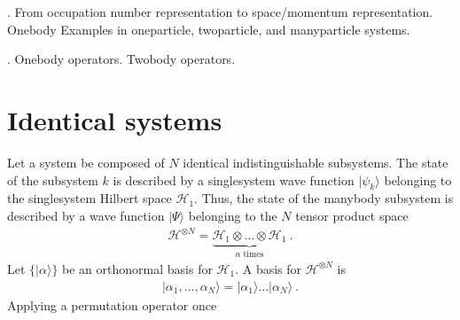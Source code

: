 \documentclass[letterpaper,10pt,english]{jupyterBook}
\begin{document}
\sphinxAtStartPar
{\hyperref[\detokenize{ch/quantum-mechanics/many-body/quantum-fields:quantum-mechanics-second-quantizazion-quantum-fields}]{}}. From occupation number representation to space/momentum representation. One\sphinxhyphen{}body Examples in one\sphinxhyphen{}particle, two\sphinxhyphen{}particle, and many\sphinxhyphen{}particle systems.

\sphinxAtStartPar
{\hyperref[\detokenize{ch/quantum-mechanics/many-body/operators:quantum-mechanics-second-quantizazion-operators}]{}}. One\sphinxhyphen{}body operators. Two\sphinxhyphen{}body operators.



\sphinxstepscope


\section{Identical systems}
\label{\detokenize{ch/quantum-mechanics/many-body/identical-systems:quantum-mechanics-second-quantizazion-identical}}\label{\detokenize{ch/quantum-mechanics/many-body/identical-systems:identical-systems}}\label{\detokenize{ch/quantum-mechanics/many-body/identical-systems::doc}}
\sphinxAtStartPar
Let a system be composed of \(N\) identical indistinguishable sub\sphinxhyphen{}systems. The state of the subsystem \(k\) is described by a single\sphinxhyphen{}system wave function \(| \psi_k \rangle\) belonging to the single\sphinxhyphen{}system Hilbert space \(\mathcal{H}_1\). Thus, the state of the many\sphinxhyphen{}body subsystem is described by a wave function \(| \Psi \rangle\) belonging to the \(N\) tensor product space
\begin{equation*}
\begin{split}\mathcal{H}^{\otimes N} = \underbrace{\mathcal{H}_1 \otimes \dots \otimes \mathcal{H}_1}_{n \text{ times}} \ .\end{split}
\end{equation*}
\sphinxAtStartPar
Let \(\{ | \alpha \rangle \}\) be an orthonormal basis for \(\mathcal{H}_1\). A basis for \(\mathcal{H}^{\otimes N}\) is
\begin{equation*}
\begin{split}| \alpha_1, \dots, \alpha_N \rangle = | \alpha_1 \rangle \dots | \alpha_N \rangle \ .\end{split}
\end{equation*}
\sphinxAtStartPar
{} Applying a permutation operator once
\end{document}
